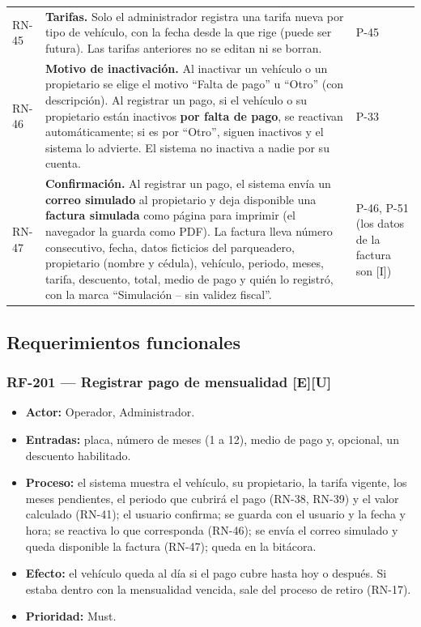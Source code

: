 \begin{longtable}{>{\raggedright\arraybackslash}p{1.5cm}>{\raggedright\arraybackslash}p{11.4cm}>{\raggedright\arraybackslash}p{1.5cm}}
RN-45 & \textbf{Tarifas.} Solo el administrador registra una tarifa nueva por tipo de vehículo, con la fecha desde la que rige (puede ser futura). Las tarifas anteriores no se editan ni se borran. & [U] P-45\\
RN-46 & \textbf{Motivo de inactivación.} Al inactivar un vehículo o un propietario se elige el motivo ``Falta de pago'' u ``Otro'' (con descripción). Al registrar un pago, si el vehículo o su propietario están inactivos \textbf{por falta de pago}, se reactivan automáticamente; si es por ``Otro'', siguen inactivos y el sistema lo advierte. El sistema no inactiva a nadie por su cuenta. & [U] P-33\\
RN-47 & \textbf{Confirmación.} Al registrar un pago, el sistema envía un \textbf{correo simulado} al propietario y deja disponible una \textbf{factura simulada} como página para imprimir (el navegador la guarda como PDF). La factura lleva número consecutivo, fecha, datos ficticios del parqueadero, propietario (nombre y cédula), vehículo, periodo, meses, tarifa, descuento, total, medio de pago y quién lo registró, con la marca ``Simulación – sin validez fiscal''. & [U] P-46, P-51 (los datos de la factura son [I])\\
\bottomrule
\end{longtable}




\subsection{Requerimientos funcionales}

\subsubsection{RF-201 — Registrar pago de mensualidad [E][U]}
\begin{itemize}
  \item \textbf{Actor:} Operador, Administrador.
  \item \textbf{Entradas:} placa, número de meses (1 a 12), medio de pago y, opcional, un descuento habilitado.
  \item \textbf{Proceso:} el sistema muestra el vehículo, su propietario, la tarifa vigente, los meses pendientes, el periodo que cubrirá el pago (RN-38, RN-39) y el valor calculado (RN-41); el usuario confirma; se guarda con el usuario y la fecha y hora; se reactiva lo que corresponda (RN-46); se envía el correo simulado y queda disponible la factura (RN-47); queda en la bitácora.
  \item \textbf{Efecto:} el vehículo queda al día si el pago cubre hasta hoy o después. Si estaba dentro con la mensualidad vencida, sale del proceso de retiro (RN-17).
  \item \textbf{Prioridad:} Must.
\end{itemize}

